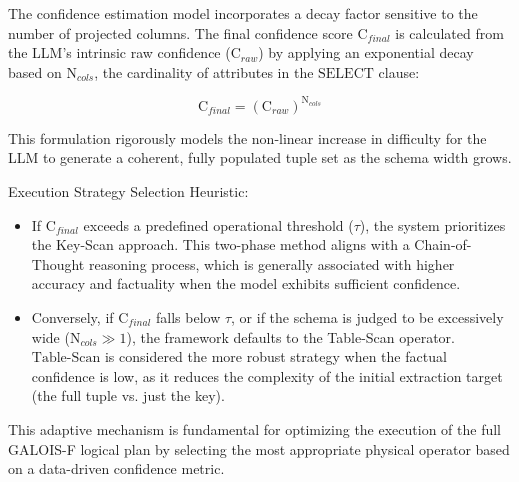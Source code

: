 The confidence estimation model incorporates a decay factor sensitive to the number of projected columns. The final confidence score $\text{C}_{final}$ is calculated from the LLM's intrinsic raw confidence ($\text{C}_{raw}$) by applying an exponential decay based on $\text{N}_{cols}$, the cardinality of attributes in the $\text{SELECT}$ clause:

$$
\text{C}_{final} = (\text{C}_{raw})^{\text{N}_{cols}}
$$

This formulation rigorously models the non-linear increase in difficulty for the LLM to generate a coherent, fully populated tuple set as the schema width grows.

Execution Strategy Selection Heuristic:
\begin{itemize}
    \item If $\text{C}_{final}$ exceeds a predefined operational threshold ($\tau$), the system prioritizes the Key-Scan approach. This two-phase method aligns with a Chain-of-Thought reasoning process, which is generally associated with higher accuracy and factuality when the model exhibits sufficient confidence.
    \item Conversely, if $\text{C}_{final}$ falls below $\tau$, or if the schema is judged to be excessively wide ($\text{N}_{cols} \gg 1$), the framework defaults to the Table-Scan operator. $\text{Table-Scan}$ is considered the more robust strategy when the factual confidence is low, as it reduces the complexity of the initial extraction target (the full tuple vs. just the key).
\end{itemize}
This adaptive mechanism is fundamental for optimizing the execution of the full GALOIS-F logical plan by selecting the most appropriate physical operator based on a data-driven confidence metric.
